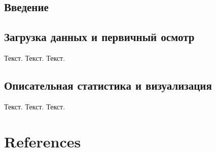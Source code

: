 \documentclass[
  letterpaper,
  DIV=11,
  numbers=noendperiod]{scrreprt}
\begin{document}
\section{Введение}\label{ux432ux432ux435ux434ux435ux43dux438ux435-7}

\section{Загрузка данных и первичный
осмотр}\label{ux437ux430ux433ux440ux443ux437ux43aux430-ux434ux430ux43dux43dux44bux445-ux438-ux43fux435ux440ux432ux438ux447ux43dux44bux439-ux43eux441ux43cux43eux442ux440-3}

Текст. Текст. Текст.

\section{Описательная статистика и
визуализация}\label{ux43eux43fux438ux441ux430ux442ux435ux43bux44cux43dux430ux44f-ux441ux442ux430ux442ux438ux441ux442ux438ux43aux430-ux438-ux432ux438ux437ux443ux430ux43bux438ux437ux430ux446ux438ux44f-4}

Текст. Текст. Текст.


\chapter*{References}\label{references}


\label{refs}
\end{document}
